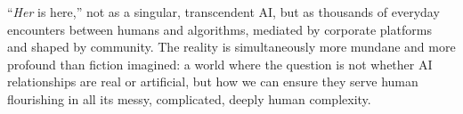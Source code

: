 \documentclass[sigconf, nonacm]{acmart}
\begin{document}
``\textit{Her} is here,'' not as a singular, transcendent AI, but as thousands of everyday encounters between humans and algorithms, mediated by corporate platforms and shaped by community. The reality is simultaneously more mundane and more profound than fiction imagined: a world where the question is not whether AI relationships are real or artificial, but how we can ensure they serve human flourishing in all its messy, complicated, deeply human complexity.










\end{document}
